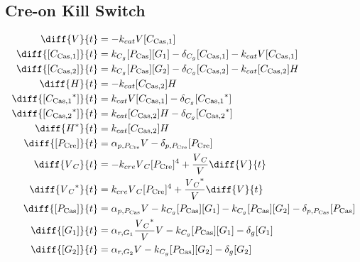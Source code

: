 \subsection{Cre-on Kill Switch}
\label{s:Cre_on_Kill_Switch}

\begin{align}
\diff{\vectorGen{}}{t} & = - \casCutRate{{}}\vectorGen{}\conc{\cplx{\cas}{1}}\\
\diff{\conc{\cplx{\cas}{1}}}{t} & =  \gRnaBind{}\conc{\proSp{\cas{}}}\conc{\gRna{1}} - \casCompDegradeRate{}\conc{\cplx{\cas}{1}} - \casCutRate{{}}\vectorGen{}\conc{\cplx{\cas}{1}}\\
\diff{\conc{\cplx{\cas}{2}}}{t} & =  \gRnaBind{}\conc{\proSp{\cas{}}}\conc{\gRna{2}} - \casCompDegradeRate{}\conc{\cplx{\cas}{2}} - \casCutRate{{}}\conc{\cplx{\cas}{2}}\hostGen{}\\
\diff{\hostGen{}}{t} & = - \casCutRate{{}}\conc{\cplx{\cas}{2}}\hostGen{}\\
\diff{\conc{\bound{\cplx{\cas}{1}}}}{t} & =  \casCutRate{{}}\vectorGen{}\conc{\cplx{\cas}{1}} - \casCompDegradeRate{}\conc{\bound{\cplx{\cas}{1}}}\\
\diff{\conc{\bound{\cplx{\cas}{2}}}}{t} & =  \casCutRate{{}}\conc{\cplx{\cas}{2}}\hostGen{} - \casCompDegradeRate{}\conc{\bound{\cplx{\cas}{2}}}\\
\diff{\edited{\hostGen{}}}{t} & =  \casCutRate{{}}\conc{\cplx{\cas}{2}}\hostGen{}\\
\diff{\conc{\proSp{\cre{}}}}{t} & =  \txtlRate{\proSp{\cre{}}}\vectorGen{} - \proDegradeRate{\proSp{\cre{}}}\conc{\proSp{\cre{}}}\\
\diff{\vectorGen{}_C}{t} & = - \creCutRate{} \vectorGen{}_C \conc{\proSp{\cre{}}}^4 + \frac{\vectorGen{}_C}{\vectorGen{}} \diff{\vectorGen{}}{t}\\
\diff{\edited{\vectorGen{}_C}}{t} & =  \creCutRate{} \vectorGen{}_C \conc{\proSp{\cre{}}}^4 + \frac{\edited{\vectorGen{}_C}}{\vectorGen{}} \diff{\vectorGen{}}{t}\\
\diff{\conc{\proSp{\cas{}}}}{t} & =  \txtlRate{\proSp{\cas{}}}\vectorGen{} - \gRnaBind{}\conc{\proSp{\cas{}}}\conc{\gRna{1}} - \gRnaBind{}\conc{\proSp{\cas{}}}\conc{\gRna{2}} - \proDegradeRate{\proSp{\cas{}}}\conc{\proSp{\cas{}}}\\
\diff{\conc{\gRna{1}}}{t} & =  \txRate{\gRna{1}}\frac{\edited{\vectorGen{}_C}}{\vectorGen{}}\vectorGen{} - \gRnaBind{}\conc{\proSp{\cas{}}}\conc{\gRna{1}} - \rnaDegradeRate{}\conc{\gRna{1}}\\
\diff{\conc{\gRna{2}}}{t} & =  \txRate{\gRna{2}}\vectorGen{} - \gRnaBind{}\conc{\proSp{\cas{}}}\conc{\gRna{2}} - \rnaDegradeRate{}\conc{\gRna{2}}
\end{align}

